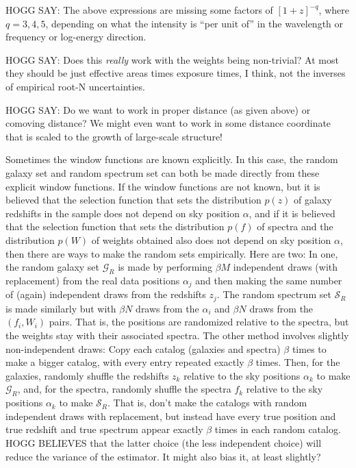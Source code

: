 \documentclass{article}
\newcommand{\set}[1]{\mathscr{#1}}
\begin{document}
HOGG SAY: The above expressions are missing some factors of $[1+z]^{-q}$, where $q=3,4,5$, depending on what the intensity is ``per unit of'' in the wavelength or frequency or log-energy direction.

HOGG SAY: Does this \emph{really} work with the weights being non-trivial?
At most they should be just effective areas times exposure times, I think, not the inverses of empirical root-N uncertainties.

HOGG SAY: Do we want to work in proper distance (as given above) or comoving distance?
We might even want to work in some distance coordinate that is scaled to the growth of large-scale structure!

Sometimes the window functions are known explicitly.
In this case, the random galaxy set and random spectrum set can both be made directly from these explicit window functions.
If the window functions are not known, but it is believed that the selection function that sets the distribution $p(z)$ of galaxy redshifts in the sample does not depend on sky position $\alpha$, and if it is believed that the selection function that sets the distribution $p(f)$ of spectra and the distribution $p(W)$ of weights obtained also does not depend on sky position $\alpha$, then there are ways to make the random sets empirically.
Here are two:
In one, the random galaxy set $\set{G}_R$ is made by performing $\beta M$ independent draws (with replacement) from the real data positions $\alpha_j$ and then making the same number of (again) independent draws from the redshifts $z_j$.
The random spectrum set $\set{S}_R$ is made similarly but with $\beta N$ draws from the $\alpha_i$ and $\beta N$ draws from the $(f_i, W_i)$ pairs.
That is, the positions are randomized relative to the spectra, but the weights stay with their associated spectra.
The other method involves slightly non-independent draws:
Copy each catalog (galaxies and spectra) $\beta$ times to make a bigger catalog, with every entry repeated exactly $\beta$ times.
Then, for the galaxies, randomly shuffle the redshifts $z_k$ relative to the sky positions $\alpha_k$ to make $\set{G}_R$,
and, for the spectra, randomly shuffle the spectra $f_k$ relative to the sky positions $\alpha_k$ to make $\set{S}_R$. 
That is, don't make the catalogs with random independent draws with replacement, but instead have every true position and true redshift and true spectrum appear exactly $\beta$ times in each random catalog.
HOGG BELIEVES that the latter choice (the less independent choice) will reduce the variance of the estimator.
It might also bias it, at least slightly?
\end{document}
